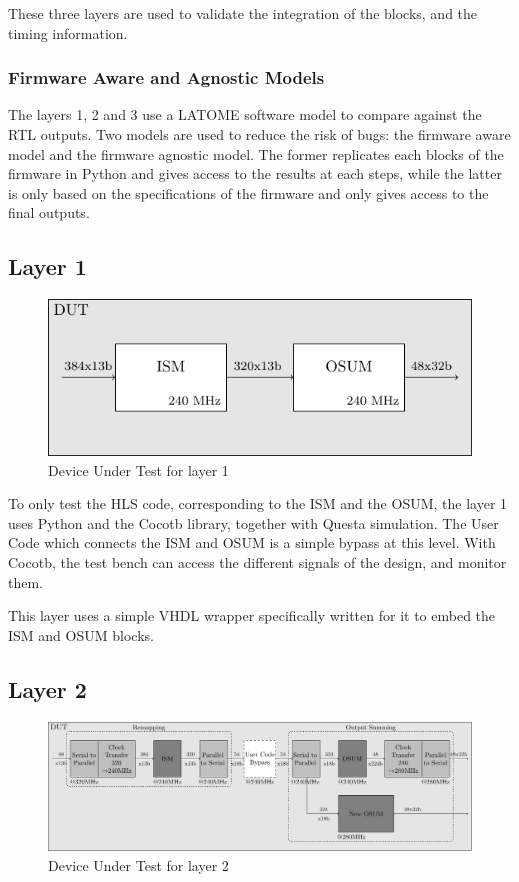 These three layers are used to validate the integration of the blocks, and the timing information.

\subsubsection{Firmware Aware and Agnostic Models}

The layers 1, 2 and 3 use a LATOME software model to compare against the RTL outputs. Two models are used to reduce the risk of bugs: the firmware aware model and the firmware agnostic model. The former replicates each blocks of the firmware in Python and gives access to the results at each steps, while the latter is only based on the specifications of the firmware and only gives access to the final outputs.

\subsection{Layer 1}

\begin{figure}[htb]
    \centering
    \includegraphics{diagrams/l1}
    \caption{Device Under Test for layer 1}
    \label{fig:dut-l1}
\end{figure}

To only test the HLS code, corresponding to the ISM and the OSUM, the layer 1 uses Python and the Cocotb library, together with Questa simulation. The User Code which connects the ISM and OSUM is a simple bypass at this level. With Cocotb, the test bench can access the different signals of the design, and monitor them. 

This layer uses a simple VHDL wrapper specifically written for it to embed the ISM and OSUM blocks. 

\subsection{Layer 2}

\begin{figure}[htb]
    \centering
    \includegraphics[width=1\textwidth]{diagrams/l2}
    \caption{Device Under Test for layer 2}
    \label{fig:dut-l2}
\end{figure}

